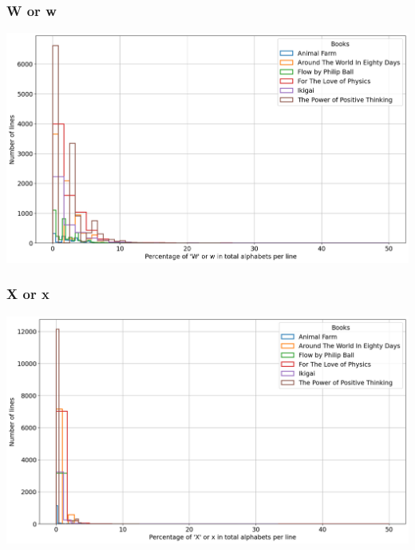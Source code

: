 \begin{frame}
    \frametitle{W or w}
    \begin{center}
        \hspace*{-5ex}
        \includegraphics[scale=0.35]{../01_programFiles/histograms/w.png}\hspace{10ex}
    \end{center}
\end{frame}

\begin{frame}
    \frametitle{X or x}
    \begin{center}
        \hspace*{-5ex}
        \includegraphics[scale=0.35]{../01_programFiles/histograms/x.png}\hspace{10ex}
    \end{center}
\end{frame}

